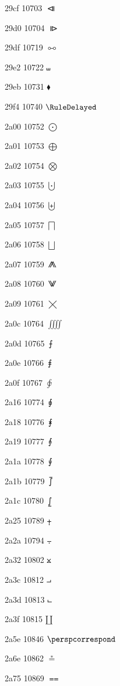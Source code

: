 \documentclass[11pt]{article}
\begin{document}
29cf 10703 \ensuremath{\LeftTriangleBar}

29d0 10704 \ensuremath{\RightTriangleBar}

29df 10719 \ensuremath{\dualmap}

29e2 10722 \ensuremath{\shuffle}

29eb 10731 \ensuremath{\blacklozenge}

29f4 10740 \ensuremath{\RuleDelayed}

2a00 10752 \ensuremath{\bigodot}

2a01 10753 \ensuremath{\bigoplus}

2a02 10754 \ensuremath{\bigotimes}

2a03 10755 \ensuremath{\bigcupdot}

2a04 10756 \ensuremath{\biguplus}

2a05 10757 \ensuremath{\bigsqcap}

2a06 10758 \ensuremath{\bigsqcup}

2a07 10759 \ensuremath{\conjquant}

2a08 10760 \ensuremath{\disjquant}

2a09 10761 \ensuremath{\bigtimes}

2a0c 10764 \ensuremath{\iiiint}

2a0d 10765 \ensuremath{\intbar}

2a0e 10766 \ensuremath{\intBar}

2a0f 10767 \ensuremath{\clockoint}

2a16 10774 \ensuremath{\sqrint}

2a18 10776 \ensuremath{\intx}

2a19 10777 \ensuremath{\intcap}

2a1a 10778 \ensuremath{\intcup}

2a1b 10779 \ensuremath{\upint}

2a1c 10780 \ensuremath{\lowint}

2a25 10789 \ensuremath{\plusdot}

2a2a 10794 \ensuremath{\minusdot}

2a32 10802 \ensuremath{\btimes}

2a3c 10812 \ensuremath{\intprod}

2a3d 10813 \ensuremath{\intprodr}

2a3f 10815 \ensuremath{\amalg}

2a5e 10846 \ensuremath{\perspcorrespond}

2a6e 10862 \ensuremath{\stackrel{*}{=}}

2a75 10869 \ensuremath{\Equal}
\end{document}
